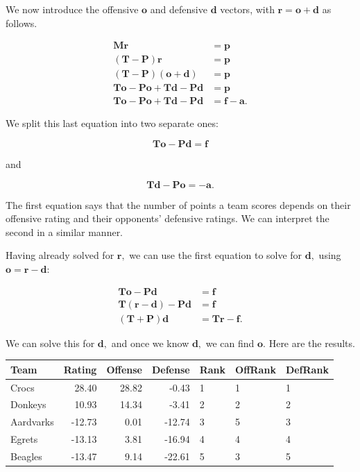 \documentclass[
]{book}
\theoremstyle{definition}
\theoremstyle{definition}
\theoremstyle{definition}
\theoremstyle{definition}
\theoremstyle{remark}
\begin{document}
We now introduce the offensive \(\mathbf{o}\) and defensive \(\mathbf{d}\) vectors, with \(\mathbf{r}=\mathbf{o}+\mathbf{d}\) as follows.

\begin{align*}
    \mathbf{M}\mathbf{r}&=\mathbf{p}\\
    (\mathbf{T}-\mathbf{P})\mathbf{r}&=\mathbf{p}\\
    (\mathbf{T}-\mathbf{P})(\mathbf{o}+\mathbf{d})&=\mathbf{p}\\
    \mathbf{T}\mathbf{o}-\mathbf{P}\mathbf{o}+\mathbf{T}\mathbf{d}-\mathbf{P}\mathbf{d}&=\mathbf{p}\\
    \mathbf{T}\mathbf{o}-\mathbf{P}\mathbf{o}+\mathbf{T}\mathbf{d}-\mathbf{P}\mathbf{d}&=\mathbf{f}-\mathbf{a}.
\end{align*}

We split this last equation into two separate ones:

\[\mathbf{T}\mathbf{o}-\mathbf{P}\mathbf{d}=\mathbf{f}\]

and

\[\mathbf{T}\mathbf{d}-\mathbf{P}\mathbf{o}=-\mathbf{a}.\]

The first equation says that the number of points a team scores depends on their offensive rating and their opponents' defensive ratings. We can interpret the second in a similar manner.

Having already solved for \(\mathbf{r},\) we can use the first equation to solve for \(\mathbf{d},\) using \(\mathbf{o}=\mathbf{r}-\mathbf{d}\):

\begin{align*}
    \mathbf{T}\mathbf{o}-\mathbf{P}\mathbf{d}&=\mathbf{f}\\
  \mathbf{T}(\mathbf{r}-\mathbf{d})-\mathbf{P}\mathbf{d}&=\mathbf{f}\\
(\mathbf{T}+\mathbf{P})\mathbf{d}&=\mathbf{T}\mathbf{r}-\mathbf{f}.
\end{align*}

We can solve this for \(\mathbf{d},\) and once we know \(\mathbf{d},\) we can find \(\textbf{o}.\) Here are the results.

\begin{longtable}[]{@{}lrrrlll@{}}
\toprule\noalign{}
Team & Rating & Offense & Defense & Rank & OffRank & DefRank \\
\midrule\noalign{}
\endhead
\bottomrule\noalign{}
\endlastfoot
Crocs & 28.40 & 28.82 & -0.43 & 1 & 1 & 1 \\
Donkeys & 10.93 & 14.34 & -3.41 & 2 & 2 & 2 \\
Aardvarks & -12.73 & 0.01 & -12.74 & 3 & 5 & 3 \\
Egrets & -13.13 & 3.81 & -16.94 & 4 & 4 & 4 \\
Beagles & -13.47 & 9.14 & -22.61 & 5 & 3 & 5 \\
\end{longtable}
\end{document}
